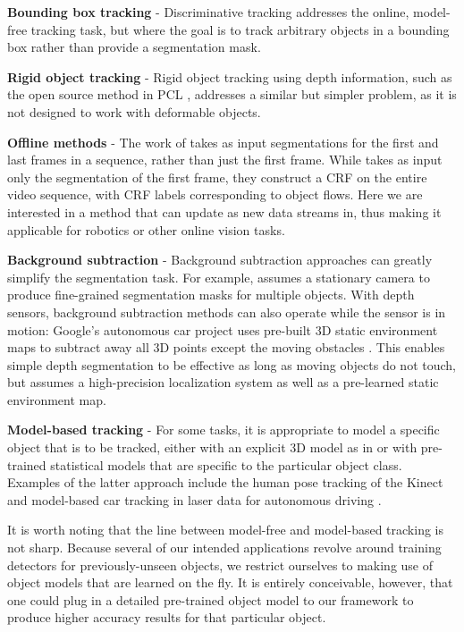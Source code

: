 \documentclass[journal]{IEEEtran}
\begin{document}
\textbf{Bounding box tracking} - Discriminative tracking \cite{grabner2006a, stalder2009a, kalal2010a} addresses the online, model-free tracking task, but where the goal is to track arbitrary objects in a bounding box rather than provide a segmentation mask.

\textbf{Rigid object tracking} - Rigid object tracking using depth information, such as the open source method in PCL \cite{rusu2011a}, addresses a similar but simpler problem, as it is not designed to work with deformable objects.

\textbf{Offline methods} - The work of \cite{budvytis2011a} takes as input segmentations for the first and last frames in a sequence, rather than just the first frame.  While \cite{tsai2010a} takes as input only the segmentation of the first frame, they construct a CRF on the entire video sequence, with CRF labels corresponding to object flows.  Here we are interested in a method that can update as new data streams in, thus making it applicable for robotics or other online vision tasks.

\textbf{Background subtraction} - Background subtraction approaches can greatly simplify the segmentation task.  For example, \cite{aeschliman2010a} assumes a stationary camera to produce fine-grained segmentation masks for multiple objects.  With depth sensors, background subtraction methods can also operate while the sensor is in motion: Google's autonomous car project uses pre-built 3D static environment maps to subtract away all 3D points except the moving obstacles \cite{urmson2011a}.  This enables simple depth segmentation to be effective as long as moving objects do not touch, but assumes a high-precision localization system as well as a pre-learned static environment map.

\textbf{Model-based tracking} - For some tasks, it is appropriate to model a specific object that is to be tracked, either with an explicit 3D model as in \cite{prisacariu2009a} or with pre-trained statistical models that are specific to the particular object class.  Examples of the latter approach include the human pose tracking of the Kinect \cite{shotton2011a} and model-based car tracking in laser data for autonomous driving \cite{petrovskaya2009a}.

It is worth noting that the line between model-free and model-based tracking is not sharp.  Because several of our intended applications revolve around training detectors for previously-unseen objects, we restrict ourselves to making use of object models that are learned on the fly.  It is entirely conceivable, however, that one could plug in a detailed pre-trained object model to our framework to produce higher accuracy results for that particular object.
\end{document}
